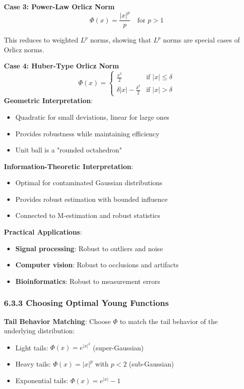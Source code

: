 \documentclass{amsart}
\theoremstyle{plain}
\theoremstyle{definition}
\theoremstyle{remark}
\begin{document}
\textbf{Case 3: Power-Law Orlicz Norm}
\[
\Phi(x) = \frac{|x|^p}{p} \quad \text{for } p > 1
\]

This reduces to weighted $L^p$ norms, showing that $L^p$ norms are special cases of Orlicz norms.

\textbf{Case 4: Huber-Type Orlicz Norm}
\[
\Phi(x) = \begin{cases}
\frac{x^2}{2} & \text{if } |x| \leq \delta \\
\delta|x| - \frac{\delta^2}{2} & \text{if } |x| > \delta
\end{cases}
\]
\textbf{Geometric Interpretation}:

\begin{itemize}
	\item Quadratic for small deviations, linear for large ones
	\item Provides robustness while maintaining efficiency
	\item Unit ball is a "rounded octahedron"
\end{itemize}

\textbf{Information-Theoretic Interpretation}:

\begin{itemize}
	\item Optimal for contaminated Gaussian distributions
	\item Provides robust estimation with bounded influence
	\item Connected to M-estimation and robust statistics
\end{itemize}

\textbf{Practical Applications}:

\begin{itemize}
	\item \textbf{Signal processing}: Robust to outliers and noise
	\item \textbf{Computer vision}: Robust to occlusions and artifacts
	\item \textbf{Bioinformatics}: Robust to measurement errors
\end{itemize}

\subsubsection{6.3.3 Choosing Optimal Young Functions}

\textbf{Tail Behavior Matching}:
Choose $\Phi$ to match the tail behavior of the underlying distribution:

\begin{itemize}
	\item Light tails: $\Phi(x) = e^{|x|^2}$ (super-Gaussian)
	\item Heavy tails: $\Phi(x) = |x|^p$ with $p < 2$ (sub-Gaussian)
	\item Exponential tails: $\Phi(x) = e^{|x|} - 1$
\end{itemize}
\end{document}
